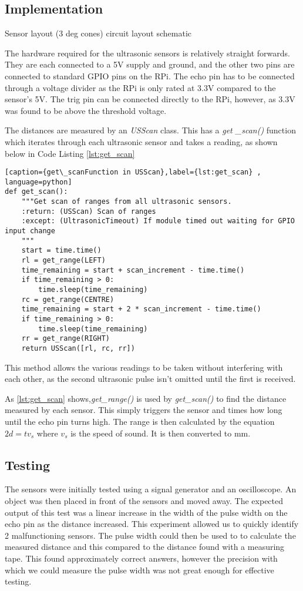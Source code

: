 \subsection{Implementation}\label{elec/range/impl}
Sensor layout (3 deg cones)
circuit layout
schematic

The hardware required for the ultrasonic sensors is relatively straight forwards. 
They are each connected to a 5V supply and ground, and the other two pins are 
connected to standard GPIO pins on the RPi. The echo pin has to be connected through 
a voltage divider as the RPi is only rated at 3.3V compared to the sensor's 5V. The 
trig pin can be connected directly to the RPi, however, as 3.3V was found to be above 
the threshold voltage.

The distances are measured by an \textit{USScan} class. This has a \textit{get
\_scan()} function which iterates through each ultrasonic sensor and takes a reading, 
as shown below in Code Listing \ref{lst:get_scan}

\begin{lstlisting}[caption={get\_scanFunction in USScan},label={lst:get_scan} , language=python]
def get_scan():
    """Get scan of ranges from all ultrasonic sensors.
    :return: (USScan) Scan of ranges
    :except: (UltrasonicTimeout) If module timed out waiting for GPIO input change
    """
    start = time.time()
    rl = get_range(LEFT)
    time_remaining = start + scan_increment - time.time()
    if time_remaining > 0:
        time.sleep(time_remaining)
    rc = get_range(CENTRE)
    time_remaining = start + 2 * scan_increment - time.time()
    if time_remaining > 0:
        time.sleep(time_remaining)
    rr = get_range(RIGHT)
    return USScan([rl, rc, rr])
\end{lstlisting}

This method allows the various readings to be taken without interfering with each other, as the second ultrasonic pulse isn't omitted until the first is received.

As \ref{lst:get_scan} shows,\textit{get\_range()} is used by 
\textit{get\_scan()} to find the distance measured by each sensor.
This simply triggers the sensor and times how long until the echo
pin turns high. The range is then calculated by the equation 
$ 2d = tv_s$ where $v_s$ is the speed of sound. It is then converted 
to mm.

\subsection{Testing}\label{elec/range/test}
The sensors were initially tested using a signal generator and an
oscilloscope. An object was then placed in front of the sensors
and moved away. The expected output of this test was a linear increase
in the width of the pulse width on the echo pin as the distance 
increased. This experiment allowed us to quickly identify 2 
malfunctioning sensors. The pulse width could then be used to to 
calculate the measured distance and this compared to the distance 
found with a measuring tape. This found approximately correct answers, 
however the precision with which we could measure the pulse width was
not great enough for effective testing.

